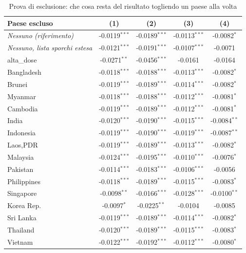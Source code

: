 \begin{table}[htbp]
\centering
\footnotesize
\caption{Prova di esclusione: che cosa resta del risultato togliendo un paese alla volta}
\label{tab:loo}
\begin{threeparttable}
\begin{tabular}{lcccc}
\toprule
Paese escluso & (1) & (2) & (3) & (4) \\
\midrule
\textit{Nessuno (riferimento)} & -0.0119$^{***}$ & -0.0189$^{***}$ & -0.0113$^{***}$ & -0.0082$^{*}$ \\
\textit{Nessuno, lista sporchi estesa} & -0.0121$^{***}$ & -0.0191$^{***}$ & -0.0107$^{***}$ & -0.0071 \\
\midrule
alta\_dose & -0.0271$^{**}$ & -0.0456$^{***}$ & -0.0161 & -0.0164 \\
Bangladesh & -0.0118$^{***}$ & -0.0188$^{***}$ & -0.0113$^{***}$ & -0.0082$^{*}$ \\
Brunei & -0.0119$^{***}$ & -0.0189$^{***}$ & -0.0114$^{***}$ & -0.0082$^{*}$ \\
Myanmar & -0.0118$^{***}$ & -0.0188$^{***}$ & -0.0112$^{***}$ & -0.0081$^{*}$ \\
Cambodia & -0.0119$^{***}$ & -0.0189$^{***}$ & -0.0112$^{***}$ & -0.0081$^{*}$ \\
India & -0.0120$^{***}$ & -0.0190$^{***}$ & -0.0115$^{***}$ & -0.0084$^{**}$ \\
Indonesia & -0.0119$^{***}$ & -0.0190$^{***}$ & -0.0119$^{***}$ & -0.0087$^{**}$ \\
Laos,PDR & -0.0119$^{***}$ & -0.0189$^{***}$ & -0.0113$^{***}$ & -0.0082$^{*}$ \\
Malaysia & -0.0124$^{***}$ & -0.0195$^{***}$ & -0.0110$^{***}$ & -0.0076$^{*}$ \\
Pakistan & -0.0114$^{***}$ & -0.0183$^{***}$ & -0.0106$^{***}$ & -0.0056 \\
Philippines & -0.0118$^{***}$ & -0.0189$^{***}$ & -0.0115$^{***}$ & -0.0083$^{*}$ \\
Singapore & -0.0098$^{**}$ & -0.0166$^{***}$ & -0.0128$^{***}$ & -0.0100$^{**}$ \\
Korea Rep. & -0.0097$^{*}$ & -0.0225$^{**}$ & -0.0104 & -0.0085 \\
Sri Lanka & -0.0119$^{***}$ & -0.0189$^{***}$ & -0.0114$^{***}$ & -0.0082$^{*}$ \\
Thailand & -0.0120$^{***}$ & -0.0189$^{***}$ & -0.0115$^{***}$ & -0.0083$^{*}$ \\
Vietnam & -0.0122$^{***}$ & -0.0192$^{***}$ & -0.0112$^{***}$ & -0.0080$^{*}$ \\

\end{tabular}
\end{threeparttable}
\end{table}
